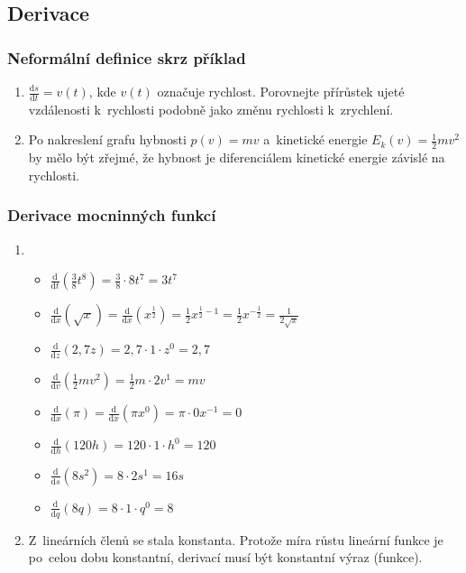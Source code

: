 \subsection*{Derivace}

\subsubsection*{Neformální definice skrz příklad}
\begin{enumerate}
    \item $\frac{\text{d}s}{\text{d}t} = v(t)$, kde $v(t)$ označuje rychlost. Porovnejte přírůstek ujeté vzdálenosti k~rychlosti podobně jako změnu rychlosti k~zrychlení.
    \item Po nakreslení grafu hybnosti $p(v) = mv$ a~kinetické energie $E_k(v) = \frac12 mv^2$ by mělo být zřejmé, že hybnost je diferenciálem kinetické energie závislé na rychlosti.
\end{enumerate}

\subsubsection*{Derivace mocninných funkcí}
\begin{enumerate}
    \item \begin{itemize}
        \item $\displaystyle \frac{\text{d}}{\text{d}t} \left( \frac38 t^8 \right) = \frac38 \cdot 8t^7 = 3t^7$
        \item $\displaystyle \frac{\text{d}}{\text{d}x} \left( \sqrt{x} \right) = \frac{\text{d}}{\text{d}x} \left( x^{\frac12} \right) = \frac12 x^{\frac12 - 1} = \frac12 x^{-\frac12} = \frac{1}{2 \sqrt{x}}$
        \item $\displaystyle \frac{\text{d}}{\text{d}z} \left( 2,7z \right) = 2,7 \cdot 1 \cdot z^0 = 2,7$
        \item $\displaystyle \frac{\text{d}}{\text{d}v} \left( \frac12 mv^2 \right) = \frac12 m \cdot 2 v^1 = mv$
        \item $\displaystyle \frac{\text{d}}{\text{d}x} \left( \pi \right) = \frac{\text{d}}{\text{d}x} \left( \pi x^0 \right) = \pi \cdot 0x^{-1} = 0$
        \item $\displaystyle \frac{\text{d}}{\text{d}h} \left( 120h \right) = 120 \cdot 1 \cdot h^0 = 120$
        \item $\displaystyle \frac{\text{d}}{\text{d}s} \left( 8s^2 \right) = 8 \cdot 2s^1 = 16s$
        \item $\displaystyle \frac{\text{d}}{\text{d}q} \left( 8q \right) = 8 \cdot 1 \cdot q^0 = 8$
    \end{itemize}
    \item Z~lineárních členů se stala konstanta. Protože míra růstu lineární funkce je po~celou dobu konstantní, derivací musí být konstantní výraz (funkce).
\end{enumerate}